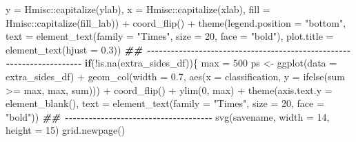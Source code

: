 \documentclass[
]{article}
\newenvironment{Shaded}{\begin{snugshade}}{\end{snugshade}}
\newcommand{\AttributeTok}[1]{\textcolor[rgb]{0.77,0.63,0.00}{#1}}
\newcommand{\ControlFlowTok}[1]{\textcolor[rgb]{0.13,0.29,0.53}{\textbf{#1}}}
\newcommand{\DecValTok}[1]{\textcolor[rgb]{0.00,0.00,0.81}{#1}}
\newcommand{\DocumentationTok}[1]{\textcolor[rgb]{0.56,0.35,0.01}{\textbf{\textit{#1}}}}
\newcommand{\FloatTok}[1]{\textcolor[rgb]{0.00,0.00,0.81}{#1}}
\newcommand{\FunctionTok}[1]{\textcolor[rgb]{0.00,0.00,0.00}{#1}}
\newcommand{\NormalTok}[1]{#1}
\newcommand{\OtherTok}[1]{\textcolor[rgb]{0.56,0.35,0.01}{#1}}
\newcommand{\SpecialCharTok}[1]{\textcolor[rgb]{0.00,0.00,0.00}{#1}}
\newcommand{\StringTok}[1]{\textcolor[rgb]{0.31,0.60,0.02}{#1}}
\begin{document}
\begin{Shaded}
\begin{Highlighting}[]
           \AttributeTok{y =}\NormalTok{ Hmisc}\SpecialCharTok{::}\FunctionTok{capitalize}\NormalTok{(ylab),}
           \AttributeTok{x =}\NormalTok{ Hmisc}\SpecialCharTok{::}\FunctionTok{capitalize}\NormalTok{(xlab),}
           \AttributeTok{fill =}\NormalTok{ Hmisc}\SpecialCharTok{::}\FunctionTok{capitalize}\NormalTok{(fill\_lab)) }\SpecialCharTok{+}
      \FunctionTok{coord\_flip}\NormalTok{() }\SpecialCharTok{+}
      \FunctionTok{theme}\NormalTok{(}\AttributeTok{legend.position =} \StringTok{"bottom"}\NormalTok{,}
            \AttributeTok{text =} \FunctionTok{element\_text}\NormalTok{(}\AttributeTok{family =} \StringTok{"Times"}\NormalTok{, }\AttributeTok{size =} \DecValTok{20}\NormalTok{, }\AttributeTok{face =} \StringTok{"bold"}\NormalTok{),}
            \AttributeTok{plot.title =} \FunctionTok{element\_text}\NormalTok{(}\AttributeTok{hjust =} \FloatTok{0.3}\NormalTok{))}
    \DocumentationTok{\#\# {-}{-}{-}{-}{-}{-}{-}{-}{-}{-}{-}{-}{-}{-}{-}{-}{-}{-}{-}{-}{-}{-}{-}{-}{-}{-}{-}{-}{-}{-}{-}{-}{-}{-}{-}{-}{-}{-}{-}{-}{-}{-}{-}{-}{-}{-}{-}{-}{-}{-}{-}{-}{-}{-}{-}{-}{-}{-}{-}{-}{-}{-}{-}{-}{-}{-}{-}{-}{-}{-} }
    \ControlFlowTok{if}\NormalTok{(}\SpecialCharTok{!}\FunctionTok{is.na}\NormalTok{(extra\_sides\_df))\{}
\NormalTok{      max }\OtherTok{=} \DecValTok{500}
\NormalTok{      ps }\OtherTok{\textless{}{-}} \FunctionTok{ggplot}\NormalTok{(}\AttributeTok{data =}\NormalTok{ extra\_sides\_df) }\SpecialCharTok{+}
        \FunctionTok{geom\_col}\NormalTok{(}\AttributeTok{width =} \FloatTok{0.7}\NormalTok{, }\FunctionTok{aes}\NormalTok{(}\AttributeTok{x =}\NormalTok{ classification, }\AttributeTok{y =} \FunctionTok{ifelse}\NormalTok{(sum }\SpecialCharTok{\textgreater{}=}\NormalTok{ max, max, sum))) }\SpecialCharTok{+}
        \FunctionTok{coord\_flip}\NormalTok{() }\SpecialCharTok{+}
        \FunctionTok{ylim}\NormalTok{(}\DecValTok{0}\NormalTok{, max) }\SpecialCharTok{+}
        \FunctionTok{theme}\NormalTok{(}\AttributeTok{axis.text.y =} \FunctionTok{element\_blank}\NormalTok{(),}
              \AttributeTok{text =} \FunctionTok{element\_text}\NormalTok{(}\AttributeTok{family =} \StringTok{"Times"}\NormalTok{, }\AttributeTok{size =} \DecValTok{20}\NormalTok{, }\AttributeTok{face =} \StringTok{"bold"}\NormalTok{))}
      \DocumentationTok{\#\# {-}{-}{-}{-}{-}{-}{-}{-}{-}{-}{-}{-}{-}{-}{-}{-}{-}{-}{-}{-}{-}{-}{-}{-}{-}{-}{-}{-}{-}{-}{-}{-}{-}{-}{-}{-}{-} }
      \FunctionTok{svg}\NormalTok{(savename, }\AttributeTok{width =} \DecValTok{14}\NormalTok{, }\AttributeTok{height =} \DecValTok{15}\NormalTok{)}
      \FunctionTok{grid.newpage}\NormalTok{()}

\end{Highlighting}
\end{Shaded}
\end{document}
